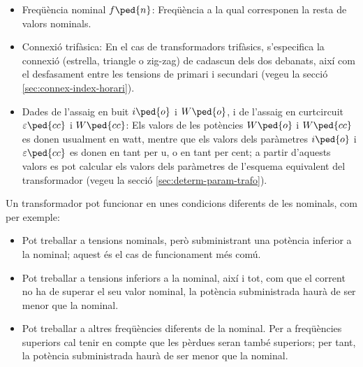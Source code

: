\begin{itemize}
\begin{equation}
\begin{cases}
        \dfrac{N_1}{\sqrt{3}N_2}, & \text{transformador trifàsic triangle--estrella} \\[0.4cm]
        \dfrac{\sqrt{3}N_1}{N_2}, & \text{transformador trifàsic estrella--triangle} \\[0.4cm]
        \dfrac{N_1}{\frac{3}{2}N_2} = \dfrac{2 N_1}{3 N_2}, & \text{transformador trifàsic triangle--zig-zag} \\[0.4cm]
        \dfrac{\sqrt{3}N_1}{\frac{3}{2}N_2} = \dfrac{2 N_1}{\sqrt{3} N_2}, & \text{transformador trifàsic estrella--zig-zag}
         \end{cases}
       \end{equation}
   \item Freqüència nominal $f\ped{n}$: Freqüència a la qual corresponen la resta de valors nominals.
   \item Connexió trifàsica: En el cas de transformadors trifàsics, s'especifica la connexió (estrella, triangle o zig-zag) de cadascun dels dos debanats, així com el desfasament entre les tensions de primari i secundari (vegeu la secció \vref{sec:connex-index-horari}).
   \item Dades de l'assaig en buit $i\ped{o}$ i $W\ped{o}$, i de l'assaig en curtcircuit $\varepsilon\ped{cc}$ i $W\ped{cc}$: Els valors de les potències $W\ped{o}$ i $W\ped{cc}$ es donen
usualment en watt, mentre que els valors dels paràmetres $i\ped{o}$
i $\varepsilon\ped{cc}$ es donen en tant per u, o en tant per cent; a partir d'aquests valors es pot calcular els valors dels paràmetres de l'esquema equivalent del transformador  (vegeu la secció \vref{sec:determ-param-trafo}).
\end{itemize}

Un transformador pot funcionar en unes condicions diferents de les nominals, com per exemple:
\begin{itemize}
   \item Pot treballar a tensions nominals, però subministrant una potència inferior a la nominal; aquest és el cas de funcionament més comú.
   \item Pot treballar a tensions inferiors a la nominal, així i tot, com que el corrent no ha de superar el seu valor nominal, la potència subministrada haurà de ser menor que la nominal.
   \item Pot treballar a altres freqüències diferents de la nominal. Per a freqüències superiors cal tenir en compte que les pèrdues seran també superiors; per tant, la potència subministrada haurà de ser menor que la nominal.
\end{itemize}

